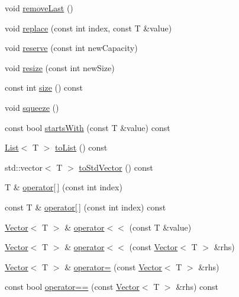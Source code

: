 \begin{DoxyCompactItemize}
\item 
void \hyperlink{classprism_1_1_vector_a0d2d2724f9ba5a520159ddce1c9b4681}{remove\+Last} ()
\item 
void \hyperlink{classprism_1_1_vector_a6efd18c9c21f2a98f59ccea0ae2b694c}{replace} (const int index, const T \&value)
\item 
void \hyperlink{classprism_1_1_vector_a617fa4a86aca478131d33984c01118ae}{reserve} (const int new\+Capacity)
\item 
void \hyperlink{classprism_1_1_vector_a13675c55c77df670075a9f80057d1d2e}{resize} (const int new\+Size)
\item 
const int \hyperlink{classprism_1_1_vector_ac6ff3296683e76da61d48bcc15e4f175}{size} () const 
\item 
void \hyperlink{classprism_1_1_vector_ab2491ac6ff73d372ed8f080adef78208}{squeeze} ()
\item 
const bool \hyperlink{classprism_1_1_vector_a7562a7e62555ee5cc35b309799cbfb05}{starts\+With} (const T \&value) const 
\item 
\hyperlink{classprism_1_1_list}{List}$<$ T $>$ \hyperlink{classprism_1_1_vector_a129dfc6925b70bb736a4539bcb323de9}{to\+List} () const 
\item 
std\+::vector$<$ T $>$ \hyperlink{classprism_1_1_vector_ae84be49ceac4011b35dd81218324b7df}{to\+Std\+Vector} () const 
\item 
T \& \hyperlink{classprism_1_1_vector_a98144a18b30f486f276bd7420db4f012}{operator\mbox{[}$\,$\mbox{]}} (const int index)
\item 
const T \& \hyperlink{classprism_1_1_vector_aec9d5e00c9127674735e321217fe3728}{operator\mbox{[}$\,$\mbox{]}} (const int index) const 
\item 
\hyperlink{classprism_1_1_vector}{Vector}$<$ T $>$ \& \hyperlink{classprism_1_1_vector_a687da3b48a2087e6e07fd5219389adb3}{operator$<$$<$} (const T \&value)
\item 
\hyperlink{classprism_1_1_vector}{Vector}$<$ T $>$ \& \hyperlink{classprism_1_1_vector_a63456dd4a36f843522f6312f0c3032e7}{operator$<$$<$} (const \hyperlink{classprism_1_1_vector}{Vector}$<$ T $>$ \&rhs)
\item 
\hyperlink{classprism_1_1_vector}{Vector}$<$ T $>$ \& \hyperlink{classprism_1_1_vector_a8e248700c87a2176c675c91d4f6a4390}{operator=} (const \hyperlink{classprism_1_1_vector}{Vector}$<$ T $>$ \&rhs)
\item 
const bool \hyperlink{classprism_1_1_vector_aedbb9a32bb25fe4bc5907fa498fe6534}{operator==} (const \hyperlink{classprism_1_1_vector}{Vector}$<$ T $>$ \&rhs) const 

\end{DoxyCompactItemize}

